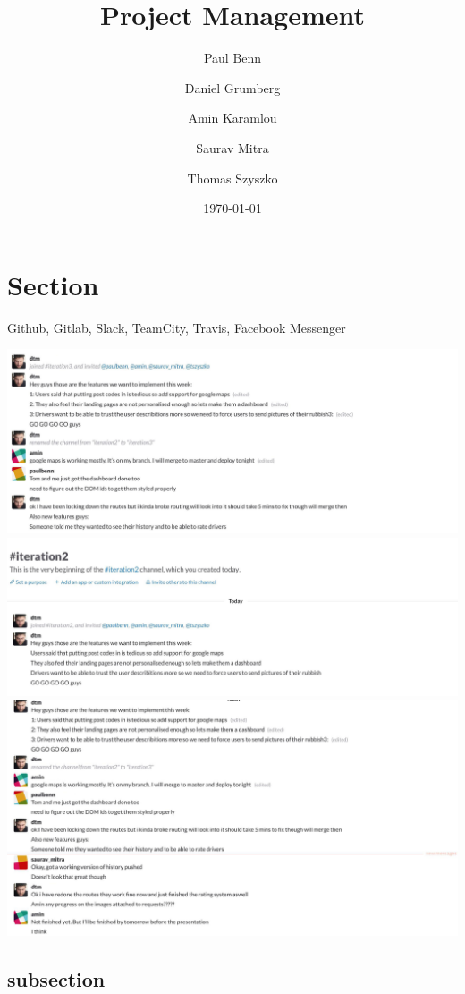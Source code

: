 \documentclass[a4wide, 11pt]{article}
\begin{document}
\title{Project Management}

\author{Paul Benn \and Daniel Grumberg \and Amin Karamlou \and Saurav Mitra \and Thomas Szyszko }

\date{\today}


\clearpage

\section{Section}

Github, Gitlab, Slack, TeamCity, Travis, Facebook Messenger

\includegraphics{slack1}
\includegraphics{slack2}
\includegraphics{slack3}

\subsection{subsection} 
\end{document}

